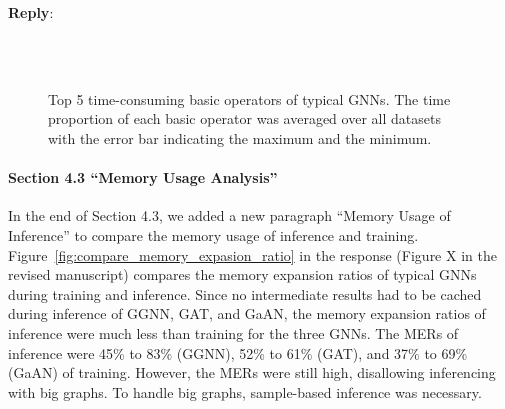 \documentclass[12pt]{article}
\newenvironment{reply}
   {\medskip \noindent \textbf{Reply}:\  }
   {\medskip}
\begin{document}
\begin{reply}
\begin{figure}[H]
         \\
         \\
         
         \caption{Top 5 time-consuming basic operators of typical GNNs. The time proportion of each basic operator was averaged over all datasets with the error bar indicating the maximum and the minimum.}
         \label{fig:compare_top_time_consuming_basic_operators}
         
    \end{figure}
    
    \paragraph{Section 4.3 ``Memory Usage Analysis''}
         
     In the end of Section 4.3, we added a new paragraph ``Memory Usage of Inference'' to compare the memory usage of inference and training.
     Figure~\ref{fig:compare_memory_expasion_ratio} in the response (Figure X in the revised manuscript) compares the memory expansion ratios of typical GNNs during training and inference.
     Since no intermediate results had to be cached during inference of GGNN, GAT, and GaAN, the memory expansion ratios of inference were much less than training for the three GNNs.
     The MERs of inference were 45\% to 83\% (GGNN), 52\% to 61\% (GAT), and 37\% to 69\% (GaAN) of training.
     However, the MERs were still high, disallowing inferencing with big graphs.
     To handle big graphs, sample-based inference was necessary.
     

\end{reply}
\end{document}
